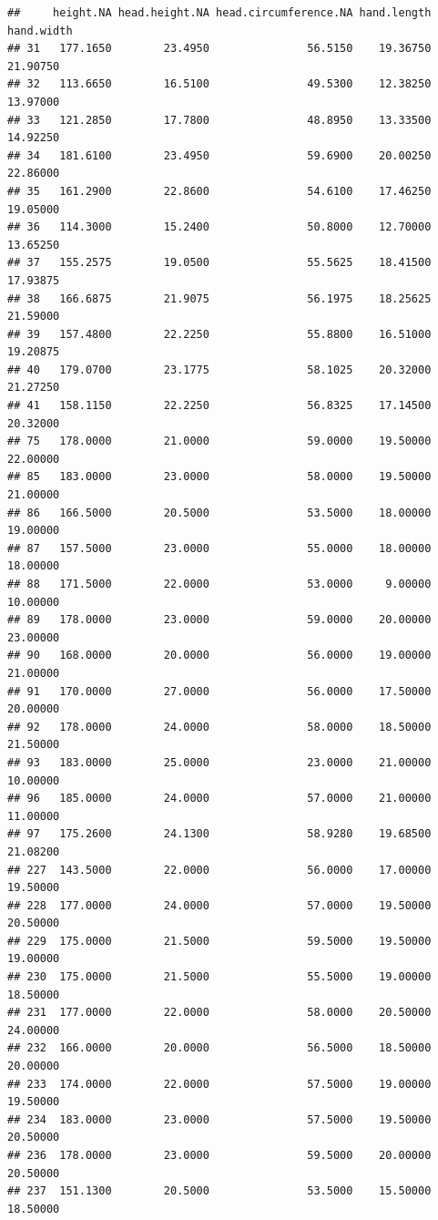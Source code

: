 \documentclass[]{article}
\begin{document}
\begin{verbatim}
##     height.NA head.height.NA head.circumference.NA hand.length hand.width
## 31   177.1650        23.4950               56.5150    19.36750   21.90750
## 32   113.6650        16.5100               49.5300    12.38250   13.97000
## 33   121.2850        17.7800               48.8950    13.33500   14.92250
## 34   181.6100        23.4950               59.6900    20.00250   22.86000
## 35   161.2900        22.8600               54.6100    17.46250   19.05000
## 36   114.3000        15.2400               50.8000    12.70000   13.65250
## 37   155.2575        19.0500               55.5625    18.41500   17.93875
## 38   166.6875        21.9075               56.1975    18.25625   21.59000
## 39   157.4800        22.2250               55.8800    16.51000   19.20875
## 40   179.0700        23.1775               58.1025    20.32000   21.27250
## 41   158.1150        22.2250               56.8325    17.14500   20.32000
## 75   178.0000        21.0000               59.0000    19.50000   22.00000
## 85   183.0000        23.0000               58.0000    19.50000   21.00000
## 86   166.5000        20.5000               53.5000    18.00000   19.00000
## 87   157.5000        23.0000               55.0000    18.00000   18.00000
## 88   171.5000        22.0000               53.0000     9.00000   10.00000
## 89   178.0000        23.0000               59.0000    20.00000   23.00000
## 90   168.0000        20.0000               56.0000    19.00000   21.00000
## 91   170.0000        27.0000               56.0000    17.50000   20.00000
## 92   178.0000        24.0000               58.0000    18.50000   21.50000
## 93   183.0000        25.0000               23.0000    21.00000   10.00000
## 96   185.0000        24.0000               57.0000    21.00000   11.00000
## 97   175.2600        24.1300               58.9280    19.68500   21.08200
## 227  143.5000        22.0000               56.0000    17.00000   19.50000
## 228  177.0000        24.0000               57.0000    19.50000   20.50000
## 229  175.0000        21.5000               59.5000    19.50000   19.00000
## 230  175.0000        21.5000               55.5000    19.00000   18.50000
## 231  177.0000        22.0000               58.0000    20.50000   24.00000
## 232  166.0000        20.0000               56.5000    18.50000   20.00000
## 233  174.0000        22.0000               57.5000    19.00000   19.50000
## 234  183.0000        23.0000               57.5000    19.50000   20.50000
## 236  178.0000        23.0000               59.5000    20.00000   20.50000
## 237  151.1300        20.5000               53.5000    15.50000   18.50000

\end{verbatim}
\end{document}
